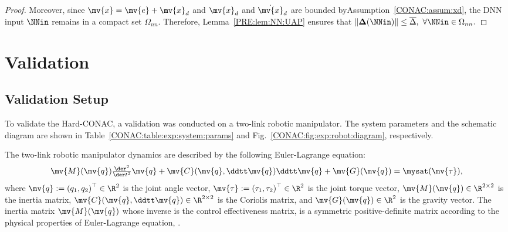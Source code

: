 \begin{proof}
Moreover, since $\mv{x}=\mv{e}+\mv{x}_d$ and $\mv{x}_d$ and $\dot{\mv{x}}_d$ are bounded byAssumption~\ref{CONAC:assum:xd}, the DNN input $\NNin$ remains in a compact set $\Omega_{nn}$. 
Therefore, Lemma~\ref{PRE:lem:NN:UAP} ensures that
$
  \|\boldsymbol{\Delta}(\NNin)\|
  \leq
  \overline{\Delta},
  \ 
  \forall\NNin\in\Omega_{nn}
  .
$

\end{proof}

\section{Validation}
\label{CONAC:sec:validation}

\subsection{Validation Setup}

To validate the Hard-CONAC, a validation was conducted on a two-link robotic manipulator.
The system parameters and the schematic diagram are shown in Table~\ref{CONAC:table:exp:system:params} and Fig.~\ref{CONAC:fig:exp:robot:diagram}, respectively.

The two-link robotic manipulator dynamics are described by the following Euler-Lagrange equation:
\begin{equation} 
  \label{CONAC:eq:robot:dynamics}
  \mv{M}(\mv{q})\tfrac{\der^2}{\der t^2}{\mv{q}}
  +
  \mv{C}(\mv{q},\ddtt\mv{q})\ddtt\mv{q}
  +
  \mv{G}(\mv{q})
  =
  \mysat
  (
    \mv{\tau}
  )
  ,
\end{equation}
where $\mv{q} := \left(q_1,q_2\right)^\top \in \R^2$ is the joint angle vector, $\mv{\tau} := \left(\tau_1,\tau_2\right)^\top \in \R^2$ is the joint torque vector, $\mv{M}(\mv{q}) \in \R^{2\times2}$ is the inertia matrix, $\mv{C}(\mv{q},\ddtt\mv{q}) \in \R^{2\times2}$ is the Coriolis matrix, and $\mv{G}(\mv{q}) \in \R^2$ is the gravity vector.
The inertia matrix $\mv{M}(\mv{q})$ whose inverse is the control effectiveness matrix, is a symmetric positive-definite matrix according to the physical properties of Euler-Lagrange equation, \cite[Lemma 3.1]{Ji:2025aa}.

